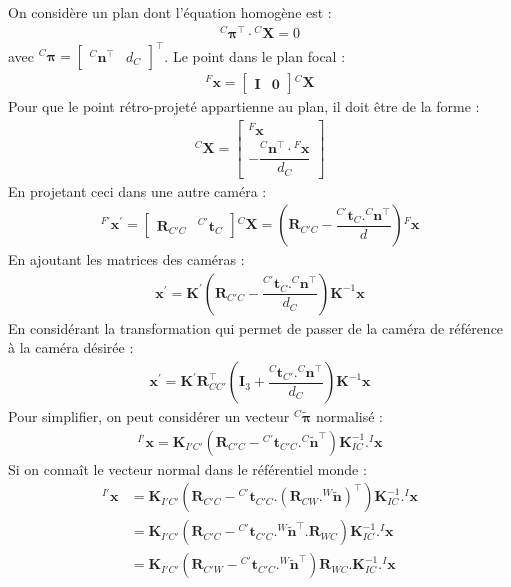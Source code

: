 \documentclass[a4paper]{article}
\begin{document}
On considère un plan dont l'équation homogène est :
\begin{align}
{}^{C}\bm{\pi}^{\top} \cdot {}^{C}\bm{X} = 0
\end{align}
avec ${}^C\bm{\pi} = \begin{bmatrix} {}^C\bm{n}^{\top} & d_C \end{bmatrix}^{\top}$. Le point dans le 
plan focal :
\begin{align}
{}^F\bm{x} = \begin{bmatrix} \bm{I} & \bm{0} \end{bmatrix} {}^C\bm{X}
\end{align}
Pour que le point rétro-projeté appartienne au plan, il doit être de la forme :
\begin{align}
{}^C\bm{X} = \begin{bmatrix} {}^F\bm{x} \\ - \dfrac{{}^C\bm{n}^{\top} \cdot {}^F\bm{x}}{d_C} \end{bmatrix}
\end{align}
En projetant ceci dans une autre caméra :
\begin{align}
{}^{F'}\bm{x}^{'} = \begin{bmatrix} \bm{R}_{C'C} & {}^{C'}\bm{t}_C \end{bmatrix} {}^C\bm{X}
= \left( \bm{R}_{C'C} - \dfrac{{}^{C'}\bm{t}_C.{}^C\bm{n}^{\top}}{d} \right) {}^F\bm{x}
\end{align}
En ajoutant les matrices des caméras :
\begin{align}
\bm{x}^{'} = \bm{K}^{'} \left( \bm{R}_{C'C} - \dfrac{{}^{C'}\bm{t}_C.{}^C\bm{n}^{\top}}{d_C} \right) 
\bm{K}^{-1} \bm{x}
\end{align}
En considérant la transformation qui permet de passer de la caméra de référence à la caméra 
désirée :
\begin{align}
\boxed{\bm{x}^{'} = \bm{K}^{'} \bm{R}_{CC'}^{\top} \left( \bm{I}_3 +  
\dfrac{{}^C\bm{t}_{C'}.{}^C\bm{n}^{\top}}{d_C} \right) \bm{K}^{-1} \bm{x}}
\end{align}
Pour simplifier, on peut considérer un vecteur ${}^C\tilde{\bm{\pi}}$ normalisé :
\begin{align}
\boxed{{}^{I'}\bm{x} = \bm{K}_{I'C'} \left( \bm{R}_{C'C} -  
{}^{C'}\bm{t}_{C'C}.{}^C\tilde{\bm{n}}^{\top} \right) \bm{K}_{IC}^{-1}.{}^I\bm{x}}
\end{align}
Si on connaît le vecteur normal dans le référentiel monde :
\begin{align}
{}^{I'}\bm{x} &= \bm{K}_{I'C'} \left( \bm{R}_{C'C} -  
{}^{C'}\bm{t}_{C'C}.(\bm{R}_{CW}.{}^W\tilde{\bm{n}})^{\top} \right) \bm{K}_{IC}^{-1}.{}^I\bm{x}\\
&= \bm{K}_{I'C'} \left( \bm{R}_{C'C} -  
{}^{C'}\bm{t}_{C'C}.{}^W\tilde{\bm{n}}^{\top}.\bm{R}_{WC} \right) \bm{K}_{IC}^{-1}.{}^I\bm{x}\\
&= \bm{K}_{I'C'} \left( \bm{R}_{C'W} -  
{}^{C'}\bm{t}_{C'C}.{}^W\tilde{\bm{n}}^{\top} \right) \bm{R}_{WC}.\bm{K}_{IC}^{-1}.{}^I\bm{x}\\
\end{align}
\end{document}
